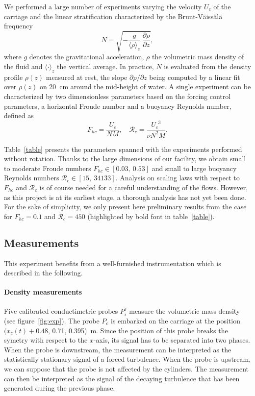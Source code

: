\documentclass[a4paper, 12pt, times]{article}
\newcommand{\R}{\mathcal{R}}
\begin{document}
\noindent We performed a large number of experiments varying the velocity $U_c$
of the carriage and the linear stratification characterized by the
Brunt-V\"aiss\"al\"a frequency
\begin{equation}
 N =  \sqrt{-\frac{g}{\langle\rho\rangle_z}~\frac{\partial \rho}{\partial z}},
\end{equation}
where $g$ denotes the gravitational acceleration, $\rho$ the volumetric mass
density of the fluid and $\langle\cdot\rangle_z$ the vertical average. In
practice, $N$ is evaluated from the density profile $\rho(z)$ measured at rest,
the slope $\partial\rho/\partial z$ being computed by a linear fit over
$\rho(z)$ on 20~cm around the mid-height of water. A single experiment can be
characterized by two dimensionless parameters based on the forcing control
parameters, a horizontal Froude number and a buoyancy Reynolds number, defined
as
\begin{equation}
 F_{hc} = \frac{U_c}{NM},\quad \R_c = \frac{{U_c}^3}{\nu N^2 M}.
\label{eq:c}
\end{equation}



\noindent Table~\ref{table} presents the parameters spanned with the
experiments performed without rotation. Thanks to the large dimensions of our
facility, we obtain small to moderate Froude numbers $F_{hc}\in[0.03,~ 0.53]$
and small to large buoyancy Reynolds numbers $\R_c\in[15,~ 34133]$.
%
\noindent Analysis on scaling laws with respect to $F_{hc}$ and $\mathcal{R}_c$
is of course needed for a careful understanding of the flows. However, as this
project is at its earliest stage, a thorough analysis has not yet been
done. For the sake of simplicity, we only present here preliminary results from
the case for $F_{hc} = 0.1$ and $\mathcal{R}_c=450$ (highlighted by bold font
in table~\ref{table}).

\subsection{Measurements}
\noindent This experiment benefits from a well-furnished instrumentation which is
described in the following.

\paragraph{Density measurements}
Five calibrated conductimetric probes $P_i^j$ measure the volumetric
mass density (see figure~\ref{fig:exp}).
%
The probe $P_c$ is embarked on the carriage at the position $(x_c(t)+0.48$,
0.71, 0.395)~m. Since the position of this probe breaks the symetry with
respect to the $x$-axis, its signal has to be separated into two phases. When
the probe is downstream, the measurement can be interpreted as the
statistically stationary signal of a forced turbulence. When the probe is
upstream, we can suppose that the probe is not affected by the
cylinders. The measurement can then be interpreted as the signal of the
decaying turbulence that has been generated during the previous phase.
\end{document}
